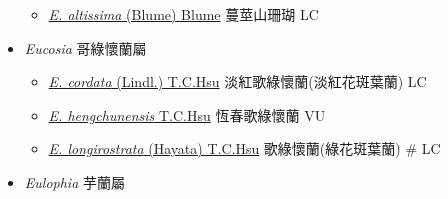 \begin{itemize}
  \begin{itemize}
        \item[] \href{http://www.theplantlist.org/tpl1.1/search?q=Erythrorchis+altissima}{\textit{E. altissima} (Blume) Blume}   蔓莖山珊瑚 LC
  \end{itemize}
 \item[] \textit{Eucosia} 哥綠懷蘭屬
                    
  \begin{itemize}
        \item[] \href{http://www.theplantlist.org/tpl1.1/search?q=Eucosia+cordata}{\textit{E. cordata} (Lindl.) T.C.Hsu}     淡紅歌綠懷蘭(淡紅花斑葉蘭)   LC
        \item[] \href{http://www.theplantlist.org/tpl1.1/search?q=Eucosia+hengchunensis}{\textit{E. hengchunensis} T.C.Hsu}   恆春歌綠懷蘭 VU
        \item[] \href{http://www.theplantlist.org/tpl1.1/search?q=Eucosia+longirostrata}{\textit{E. longirostrata} (Hayata) T.C.Hsu}        歌綠懷蘭(綠花斑葉蘭)  \# LC
  \end{itemize}
 \item[] \textit{Eulophia} 芋蘭屬
                    

\end{itemize}
